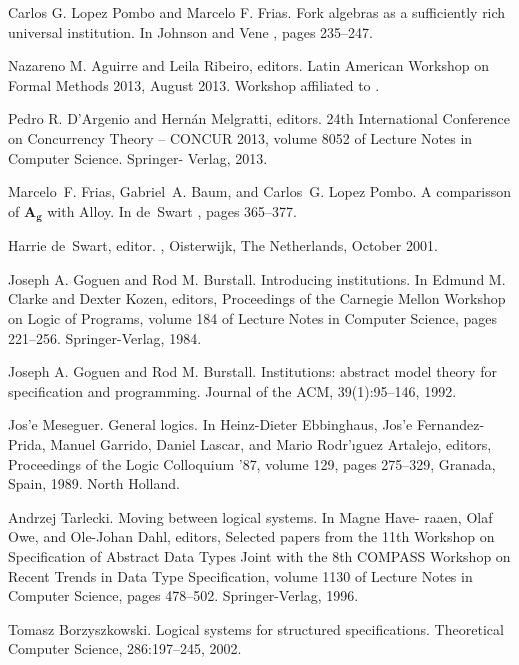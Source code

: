 \begin{thebibliography}{tesis}
 Carlos G. Lopez Pombo and Marcelo F. Frias. Fork algebras as a sufficiently rich universal institution. In Johnson and Vene \cite{JV06}, pages 235–247. 

 Nazareno M. Aguirre and Leila Ribeiro, editors. Latin American Workshop on Formal Methods 2013, August 2013. Workshop affiliated to \cite{DM13}. 

 Pedro R. D’Argenio and Hernán Melgratti, editors. 24th International Conference on Concurrency Theory – CONCUR 2013, volume 8052 of Lecture Notes in Computer Science. Springer- Verlag, 2013.

Marcelo~{F.} Frias, Gabriel~{A.} Baum, and Carlos~{G.} {Lopez Pombo}.
\newblock A comparisson of $\mathbf{A_g}$ with {Alloy}.
\newblock In de~Swart \cite{relmics01}, pages 365--377.

Harrie de~Swart, editor.
, Oisterwijk, The Netherlands, October 2001.
  
	Joseph A. Goguen and Rod M. Burstall. Introducing institutions. In Edmund M. Clarke and Dexter Kozen, editors, Proceedings of the Carnegie Mellon Workshop on Logic of Programs, volume 184 of Lecture Notes in Computer Science, pages 221–256. Springer-Verlag, 1984.

  Joseph A. Goguen and Rod M. Burstall. Institutions: abstract model theory for specification and programming. Journal of the ACM, 39(1):95–146, 1992.

	Jos'e Meseguer. General logics. In Heinz-Dieter Ebbinghaus, Jos'e Fernandez-Prida, Manuel Garrido, Daniel Lascar, and Mario Rodr'ıguez Artalejo, editors, Proceedings of the Logic Colloquium ’87, volume 129, pages 275–329, Granada, Spain, 1989. North Holland.

	Andrzej Tarlecki. Moving between logical systems. In Magne Have- raaen, Olaf Owe, and Ole-Johan Dahl, editors, Selected papers from the 11th Workshop on Specification of Abstract Data Types Joint with the 8th COMPASS Workshop on Recent Trends in Data Type Specification, volume 1130 of Lecture Notes in Computer Science, pages 478–502. Springer-Verlag, 1996.

	Tomasz Borzyszkowski. Logical systems for structured specifications. Theoretical Computer Science, 286:197–245, 2002.


\end{thebibliography}
